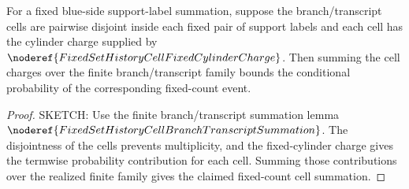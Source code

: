 \begin{helper}
For a fixed blue-side support-label summation, suppose the branch/transcript
cells are pairwise disjoint inside each fixed pair of support labels and each
cell has the cylinder charge supplied by
\(\noderef{FixedSetHistoryCellFixedCylinderCharge}\).  Then summing the cell
charges over the finite branch/transcript family bounds the conditional
probability of the corresponding fixed-count event.
\end{helper}
\begin{proof}
SKETCH:
Use the finite branch/transcript summation lemma
\(\noderef{FixedSetHistoryCellBranchTranscriptSummation}\).  The disjointness
of the cells prevents multiplicity, and the fixed-cylinder charge gives the
termwise probability contribution for each cell.  Summing those contributions
over the realized finite family gives the claimed fixed-count cell
summation.
\end{proof}
